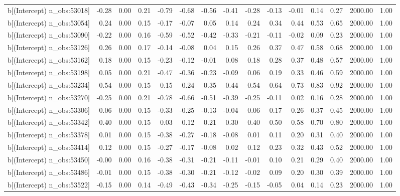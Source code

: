 \begin{table}[ht]
\begin{tabular}{rrrrrrrrrrrrrrr}
  b[(Intercept) n\_obs:53018] & -0.28 & 0.00 & 0.21 & -0.79 & -0.68 & -0.56 & -0.41 & -0.28 & -0.13 & -0.01 & 0.14 & 0.27 & 2000.00 & 1.00 \\ 
  b[(Intercept) n\_obs:53054] & 0.24 & 0.00 & 0.15 & -0.17 & -0.07 & 0.05 & 0.14 & 0.24 & 0.34 & 0.44 & 0.53 & 0.65 & 2000.00 & 1.00 \\ 
  b[(Intercept) n\_obs:53090] & -0.22 & 0.00 & 0.16 & -0.59 & -0.52 & -0.42 & -0.33 & -0.21 & -0.11 & -0.02 & 0.09 & 0.23 & 2000.00 & 1.00 \\ 
  b[(Intercept) n\_obs:53126] & 0.26 & 0.00 & 0.17 & -0.14 & -0.08 & 0.04 & 0.15 & 0.26 & 0.37 & 0.47 & 0.58 & 0.68 & 2000.00 & 1.00 \\ 
  b[(Intercept) n\_obs:53162] & 0.18 & 0.00 & 0.15 & -0.23 & -0.12 & -0.01 & 0.08 & 0.18 & 0.28 & 0.37 & 0.48 & 0.57 & 2000.00 & 1.00 \\ 
  b[(Intercept) n\_obs:53198] & 0.05 & 0.00 & 0.21 & -0.47 & -0.36 & -0.23 & -0.09 & 0.06 & 0.19 & 0.33 & 0.46 & 0.59 & 2000.00 & 1.00 \\ 
  b[(Intercept) n\_obs:53234] & 0.54 & 0.00 & 0.15 & 0.15 & 0.24 & 0.35 & 0.44 & 0.54 & 0.64 & 0.73 & 0.83 & 0.92 & 2000.00 & 1.00 \\ 
  b[(Intercept) n\_obs:53270] & -0.25 & 0.00 & 0.21 & -0.78 & -0.66 & -0.51 & -0.39 & -0.25 & -0.11 & 0.02 & 0.16 & 0.28 & 2000.00 & 1.00 \\ 
  b[(Intercept) n\_obs:53306] & 0.06 & 0.00 & 0.15 & -0.33 & -0.25 & -0.13 & -0.04 & 0.06 & 0.17 & 0.26 & 0.37 & 0.45 & 2000.00 & 1.00 \\ 
  b[(Intercept) n\_obs:53342] & 0.40 & 0.00 & 0.15 & 0.03 & 0.12 & 0.21 & 0.30 & 0.40 & 0.50 & 0.58 & 0.70 & 0.80 & 2000.00 & 1.00 \\ 
  b[(Intercept) n\_obs:53378] & 0.01 & 0.00 & 0.15 & -0.38 & -0.27 & -0.18 & -0.08 & 0.01 & 0.11 & 0.20 & 0.31 & 0.40 & 2000.00 & 1.00 \\ 
  b[(Intercept) n\_obs:53414] & 0.12 & 0.00 & 0.15 & -0.27 & -0.17 & -0.08 & 0.02 & 0.12 & 0.23 & 0.32 & 0.43 & 0.52 & 2000.00 & 1.00 \\ 
  b[(Intercept) n\_obs:53450] & -0.00 & 0.00 & 0.16 & -0.38 & -0.31 & -0.21 & -0.11 & -0.01 & 0.10 & 0.21 & 0.29 & 0.40 & 2000.00 & 1.00 \\ 
  b[(Intercept) n\_obs:53486] & -0.01 & 0.00 & 0.15 & -0.38 & -0.30 & -0.21 & -0.12 & -0.02 & 0.09 & 0.20 & 0.30 & 0.39 & 2000.00 & 1.00 \\ 
  b[(Intercept) n\_obs:53522] & -0.15 & 0.00 & 0.14 & -0.49 & -0.43 & -0.34 & -0.25 & -0.15 & -0.05 & 0.04 & 0.14 & 0.23 & 2000.00 & 1.00 \\ 

\end{tabular}
\end{table}
